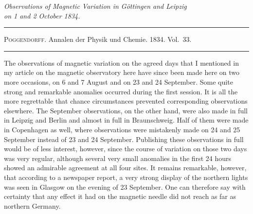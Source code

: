 \begin{center}\itshape
Observations of Magnetic Variation in Göttingen and Leipzig\\
on 1 and 2 October 1834.
\end{center}
\begin{center}
\hrule\vspace{2mm}
\textsc{Poggendorff}. Annalen der Physik und Chemie. 1834. Vol.\ 33.
\vspace{2mm}\hrule\vspace{5mm}
\end{center}
The observations of magnetic variation on the agreed days that I mentioned in my article on the magnetic observatory here have since been made here on two more occasions, on 6 and 7 August and on 23 and 24 September. Some quite strong and remarkable anomalies occurred during the first session. It is all the more regrettable that chance circumstances prevented corresponding observations elsewhere. The September observations, on the other hand, were also made in full
in Leipzig and Berlin and almost in full in Braunschweig. Half of them were made in Copenhagen as well, where observations were mistakenly made on 24 and 25 September instead of 23 and 24 September. Publishing these observations in full would be of less interest, however, since the course of variation on those two days was very regular, although several very small anomalies in the first 24 hours showed an admirable agreement at all four sites. It remains remarkable, however, that according to a newspaper report, a very strong display of the northern lights was seen in Glasgow on the evening of 23 September. One can therefore say with certainty that any effect it had on the magnetic needle did not reach as far as northern Germany.

